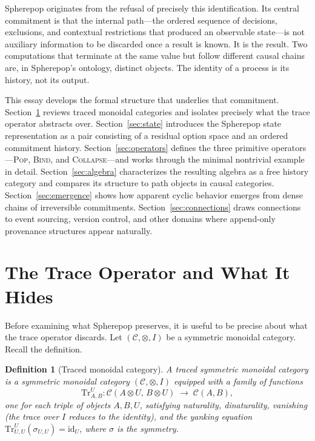 \documentclass[12pt]{article}
\newtheorem{definition}{Definition}[section]
\begin{document}
Spherepop originates from the refusal of precisely this identification. Its central commitment is that the internal path---the ordered sequence of decisions, exclusions, and contextual restrictions that produced an observable state---is not auxiliary information to be discarded once a result is known. It is the result. Two computations that terminate at the same value but follow different causal chains are, in Spherepop's ontology, distinct objects. The identity of a process is its history, not its output.

This essay develops the formal structure that underlies that commitment. Section~\ref{sec:traces} reviews traced monoidal categories and isolates precisely what the trace operator abstracts over. Section~\ref{sec:state} introduces the Spherepop state representation as a pair consisting of a residual option space and an ordered commitment history. Section~\ref{sec:operators} defines the three primitive operators---\textsc{Pop}, \textsc{Bind}, and \textsc{Collapse}---and works through the minimal nontrivial example in detail. Section~\ref{sec:algebra} characterizes the resulting algebra as a free history category and compares its structure to path objects in causal categories. Section~\ref{sec:emergence} shows how apparent cyclic behavior emerges from dense chains of irreversible commitments. Section~\ref{sec:connections} draws connections to event sourcing, version control, and other domains where append-only provenance structures appear naturally.

\section{The Trace Operator and What It Hides}
\label{sec:traces}

Before examining what Spherepop preserves, it is useful to be precise about what the trace operator discards. Let $(\mathcal{C}, \otimes, I)$ be a symmetric monoidal category. Recall the definition.

\begin{definition}[Traced monoidal category]
A \emph{traced symmetric monoidal category} is a symmetric monoidal category $(\mathcal{C}, \otimes, I)$ equipped with a family of functions
\[
\mathrm{Tr}^U_{A,B} : \mathcal{C}(A \otimes U,\, B \otimes U) \;\longrightarrow\; \mathcal{C}(A, B),
\]
one for each triple of objects $A, B, U$, satisfying naturality, dinaturality, vanishing (the trace over $I$ reduces to the identity), and the yanking equation $\mathrm{Tr}^U_{U,U}(\sigma_{U,U}) = \mathrm{id}_U$, where $\sigma$ is the symmetry.
\end{definition}
\end{document}
